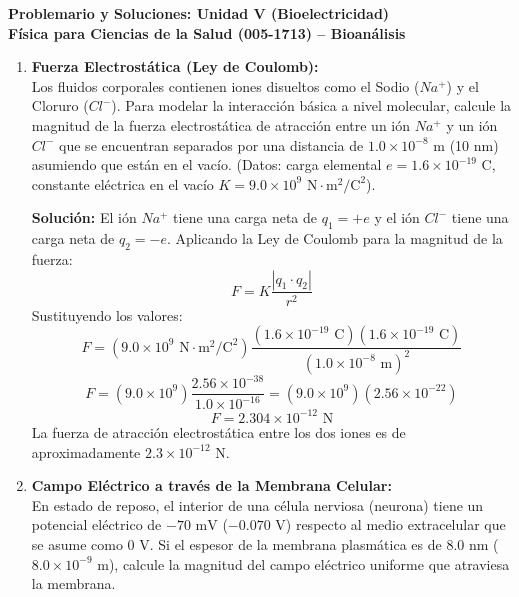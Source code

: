 \documentclass[11pt,letterpaper]{article}
\begin{document}
\begin{center}
    \textbf{\Large Problemario y Soluciones: Unidad V (Bioelectricidad)}\\
    \vspace{0.2cm}
    \textbf{Física para Ciencias de la Salud (005-1713) -- Bioanálisis}\\
\end{center}

\vspace{0.4cm}

\begin{enumerate}[leftmargin=*]

    \item \textbf{Fuerza Electrostática (Ley de Coulomb):}\\
    Los fluidos corporales contienen iones disueltos como el Sodio ($Na^+$) y el Cloruro ($Cl^-$). Para modelar la interacción básica a nivel molecular, calcule la magnitud de la fuerza electrostática de atracción entre un ión $Na^+$ y un ión $Cl^-$ que se encuentran separados por una distancia de $1.0 \times 10^{-8} \text{ m}$ (10 nm) asumiendo que están en el vacío. 
    (Datos: carga elemental $e = 1.6 \times 10^{-19} \text{ C}$, constante eléctrica en el vacío $K = 9.0 \times 10^9 \text{ N}\cdot\text{m}^2/\text{C}^2$).
    
    \textbf{Solución:}
    El ión $Na^+$ tiene una carga neta de $q_1 = +e$ y el ión $Cl^-$ tiene una carga neta de $q_2 = -e$.
    Aplicando la Ley de Coulomb para la magnitud de la fuerza:
    \[
    F = K \frac{|q_1 \cdot q_2|}{r^2}
    \]
    Sustituyendo los valores:
    \[
    F = (9.0 \times 10^9 \text{ N}\cdot\text{m}^2/\text{C}^2) \frac{(1.6 \times 10^{-19} \text{ C})(1.6 \times 10^{-19} \text{ C})}{(1.0 \times 10^{-8} \text{ m})^2}
    \]
    \[
    F = (9.0 \times 10^9) \frac{2.56 \times 10^{-38}}{1.0 \times 10^{-16}} = (9.0 \times 10^9)(2.56 \times 10^{-22})
    \]
    \[
    F = 2.304 \times 10^{-12} \text{ N}
    \]
    La fuerza de atracción electrostática entre los dos iones es de aproximadamente $2.3 \times 10^{-12} \text{ N}$.

    \vspace{0.3cm}

    \item \textbf{Campo Eléctrico a través de la Membrana Celular:}\\
    En estado de reposo, el interior de una célula nerviosa (neurona) tiene un potencial eléctrico de $-70 \text{ mV}$ ($-0.070 \text{ V}$) respecto al medio extracelular que se asume como $0 \text{ V}$. Si el espesor de la membrana plasmática es de $8.0 \text{ nm}$ ($8.0 \times 10^{-9} \text{ m}$), calcule la magnitud del campo eléctrico uniforme que atraviesa la membrana.
    

\end{enumerate}
\end{document}
